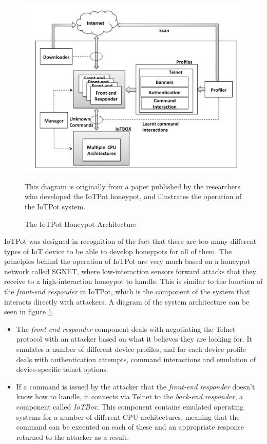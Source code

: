 \begin{figure}[ht]
      \centering
      \includegraphics[width=150mm, scale=1]{Images/iot-pot-sys-arch.PNG}
      \caption{The IoTPot Honeypot Architecture} 
      \medskip
	  \small
		This diagram is originally from a paper published by the researchers who developed the IoTPot honeypot, and illustrates the operation of the IoTPot system. \cite{IoTPot2016} 
\label{fig:Images/iot-pot-sys-arch.PNG}
\end{figure}
    
    IoTPot was designed in recognition of the fact that there are too many different types of IoT device to be able to develop honeypots for all of them. The principles behind the operation of IoTPot are very much based on a honeypot network called SGNET, where low-interaction sensors forward attacks that they receive to a high-interaction honeypot to handle. \cite{SGNET} This is similar to the function of the \textit{front-end responder} in IoTPot, which is the component of the system that interacts directly with attackers. A diagram of the system architecture can be seen in figure \ref{fig:Images/iot-pot-sys-arch.PNG}.
    
    \begin{itemize}
    \item The \textit{front-end responder} component deals with negotiating the Telnet protocol with an attacker based on what it believes they are looking for. It emulates a number of different device profiles, and for each device profile deals with authentication attempts, command interactions and emulation of device-specific telnet options.
\item If a command is issued by the attacker that the \textit{front-end responder} doesn't know how to handle, it connects via Telnet to the \textit{back-end responder}, a component called \textit{IoTBox}. This component contains emulated operating systems for a number of different CPU architectures, meaning that the command can be executed on each of these and an appropriate response returned to the attacker as a result.
    \end{itemize}
     
